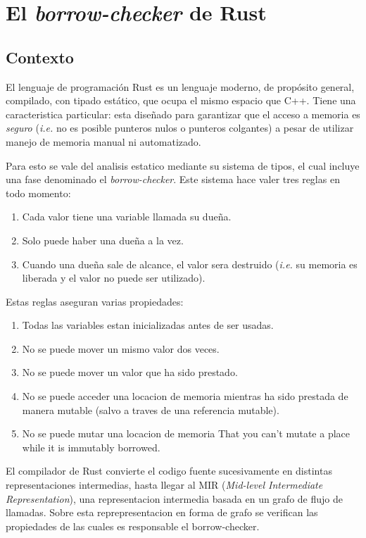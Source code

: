 \documentclass[12pt, a4paper]{article}
\begin{document}
\section{El \textit{borrow-checker} de Rust}

\subsection{Contexto}

El lenguaje de programación Rust es un lenguaje moderno, de propósito general, compilado, con tipado estático, que ocupa el mismo espacio que C++. Tiene   una caracteristica particular: esta diseñado para garantizar que el acceso a memoria es \textit{seguro} (\textit{i.e.} no es posible punteros nulos o punteros colgantes) a pesar de utilizar manejo de memoria manual ni automatizado. 

Para esto se vale del analisis estatico mediante su sistema de tipos, el cual incluye una fase denominado el \textit{borrow-checker}. 
Este sistema hace valer tres reglas en todo momento: 

\begin{enumerate}
\item Cada valor tiene una variable llamada su dueña.
\item Solo puede haber una dueña a la vez.
\item Cuando una dueña sale de alcance, el valor sera destruido (\textit{i.e.} su memoria es liberada y el valor no puede ser utilizado).
\end{enumerate}

Estas reglas aseguran varias propiedades:

\begin{enumerate}
\item Todas las variables estan inicializadas antes de ser usadas. 
\item No se puede mover un mismo valor dos veces.
\item No se puede mover un valor que ha sido prestado.
\item No se puede acceder una locacion de memoria mientras ha sido prestada de manera mutable (salvo a traves de una referencia mutable).
\item No se puede mutar una locacion de memoria That you can't mutate a place while it is immutably borrowed.
\end{enumerate}

El compilador de Rust convierte el codigo fuente sucesivamente en distintas representaciones intermedias, hasta llegar al MIR (\textit{Mid-level Intermediate Representation}), una representacion intermedia basada en un grafo de flujo de llamadas. Sobre esta reprepresentacion en forma de grafo se verifican las propiedades de las cuales es responsable el borrow-checker.
\end{document}

